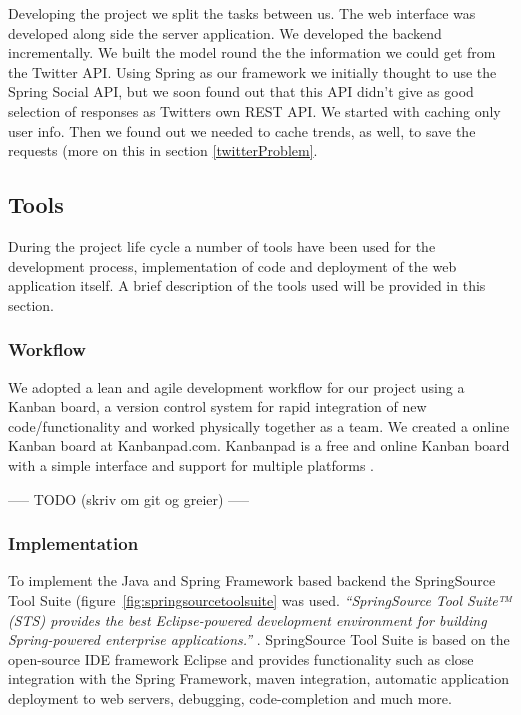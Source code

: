 Developing the project we split the tasks between us. The web interface was developed along side the server application. 
We developed the backend incrementally. We built the model round the the information we could get from the Twitter API. Using Spring as our framework we initially thought to use the Spring Social API, but we soon found out that this API didn't give as good selection of responses as Twitters own REST API.
We started with caching only user info. Then we found out we needed to cache trends, as well, to save the requests (more on this in section \ref{twitterProblem}. 


\subsection{Tools}
During the project life cycle a number of tools have been used for the development process, implementation of code and deployment of the web application itself. A brief description of the tools used will be provided in this section.

\subsubsection{Workflow}

We adopted a lean and agile development workflow for our project using a Kanban board, a version control system for rapid integration of new code/functionality and worked physically together as a team. We created a online Kanban board at Kanbanpad.com. Kanbanpad is a free and online Kanban board with a simple interface and support for multiple platforms \cite{TheHybridGroup2012}.

----- TODO (skriv om git og greier) -----


\subsubsection{Implementation}
To implement the Java and Spring Framework based backend the SpringSource Tool Suite (figure~\ref{fig:springsourcetoolsuite} was used. \textit{``SpringSource Tool Suite™ (STS) provides the best Eclipse-powered development environment for building Spring-powered enterprise applications.''} \cite{SpringSource}. SpringSource Tool Suite is based on the open-source IDE framework Eclipse and provides functionality such as close integration with the Spring Framework, maven integration, automatic application deployment to web servers, debugging, code-completion and much more.

